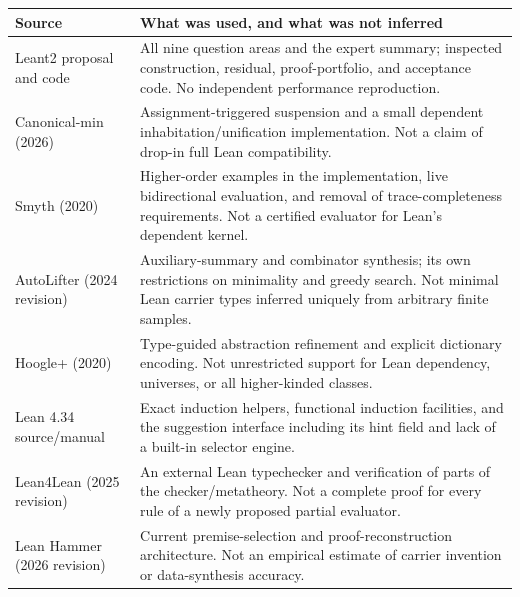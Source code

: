 \documentclass[11pt,a4paper]{article}
\theoremstyle{remark}
\begin{document}
\begin{longtable}{@{}L{40mm}L{115mm}@{}}
\toprule
Source & What was used, and what was not inferred\\
\midrule
\endhead
Leant2 proposal and code & All nine question areas and the expert summary; inspected construction, residual, proof-portfolio, and acceptance code. No independent performance reproduction.\\
Canonical-min (2026) & Assignment-triggered suspension and a small dependent inhabitation/unification implementation. Not a claim of drop-in full Lean compatibility.\\
Smyth (2020) & Higher-order examples in the implementation, live bidirectional evaluation, and removal of trace-completeness requirements. Not a certified evaluator for Lean's dependent kernel.\\
AutoLifter (2024 revision) & Auxiliary-summary and combinator synthesis; its own restrictions on minimality and greedy search. Not minimal Lean carrier types inferred uniquely from arbitrary finite samples.\\
Hoogle+ (2020) & Type-guided abstraction refinement and explicit dictionary encoding. Not unrestricted support for Lean dependency, universes, or all higher-kinded classes.\\
Lean 4.34 source/manual & Exact induction helpers, functional induction facilities, and the suggestion interface including its hint field and lack of a built-in selector engine.\\
Lean4Lean (2025 revision) & An external Lean typechecker and verification of parts of the checker/metatheory. Not a complete proof for every rule of a newly proposed partial evaluator.\\
Lean Hammer (2026 revision) & Current premise-selection and proof-reconstruction architecture. Not an empirical estimate of carrier invention or data-synthesis accuracy.\\
\bottomrule
\end{longtable}
\end{document}
